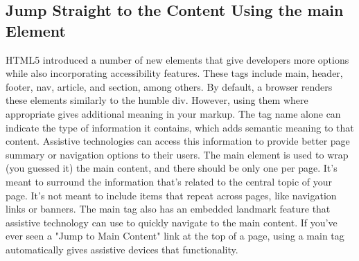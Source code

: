 \documentclass{article}%
\begin{document}
\subsection{Jump Straight to the Content Using the main Element}%
\label{subsec:JumpStraighttotheContentUsingthemainElement}%
HTML5 introduced a number of new elements that give developers more options while also incorporating accessibility features. These tags include main, header, footer, nav, article, and section, among others.\newline%
By default, a browser renders these elements similarly to the humble div. However, using them where appropriate gives additional meaning in your markup. The tag name alone can indicate the type of information it contains, which adds semantic meaning to that content. Assistive technologies can access this information to provide better page summary or navigation options to their users.\newline%
The main element is used to wrap (you guessed it) the main content, and there should be only one per page. It's meant to surround the information that's related to the central topic of your page. It's not meant to include items that repeat across pages, like navigation links or banners.\newline%
The main tag also has an embedded landmark feature that assistive technology can use to quickly navigate to the main content. If you've ever seen a "Jump to Main Content" link at the top of a page, using a main tag automatically gives assistive devices that functionality.\newline%

%
\end{document}
